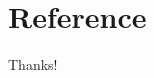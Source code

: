 \documentclass{beamer}
\begin{document}

\section{Reference}

\begin{frame}[allowframebreaks]
    
    \tiny 
\end{frame}

\begin{frame}
    \begin{center}
        {\Huge\calligra Thanks!}
    \end{center}
\end{frame}
\end{document}
